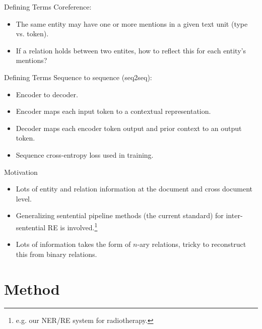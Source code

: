 \documentclass[usenames,dvipsnames,pdf]{beamer}
\begin{document}
        \begin{frame}{Defining Terms}
          Coreference:
          \begin{itemize}
          \item
            The same entity may have one or more mentions in a given text unit (type vs. token).
          \item
            If a relation holds between two entites, how to reflect this for each entity's mentions?
          \end{itemize}
        \end{frame}

        \begin{frame}{Defining Terms}
          Sequence to sequence (seq2seq):
          \begin{itemize}
          \item
            Encoder to decoder.
          \item
            Encoder maps each input token to a contextual representation.
          \item
            Decoder maps each encoder token output and prior context to an output token.
          \item
            Sequence cross-entropy loss used in training.
          \end{itemize}
        \end{frame}
        
        \begin{frame}{Motivation}
          \begin{itemize}
          \item
            Lots of entity and relation information at the document and cross document level.
          \item
            Generalizing sentential pipeline methods (the current standard)
            for inter-sentential RE is involved.\footnote{e.g. our NER/RE system for radiotherapy.}
          \item
            Lots of information takes the form of $n$-ary relations, tricky to reconstruct this from binary relations.
          \end{itemize}
        \end{frame}
        
        \section{Method}
\end{document}
